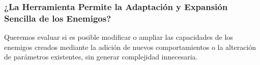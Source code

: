 \subsubsection{¿La Herramienta Permite la Adaptación y Expansión Sencilla de los Enemigos?}
Queremos evaluar si es posible modificar o ampliar las capacidades de los enemigos creados mediante la adición de nuevos comportamientos o la alteración de parámetros existentes, sin generar complejidad innecesaria.

